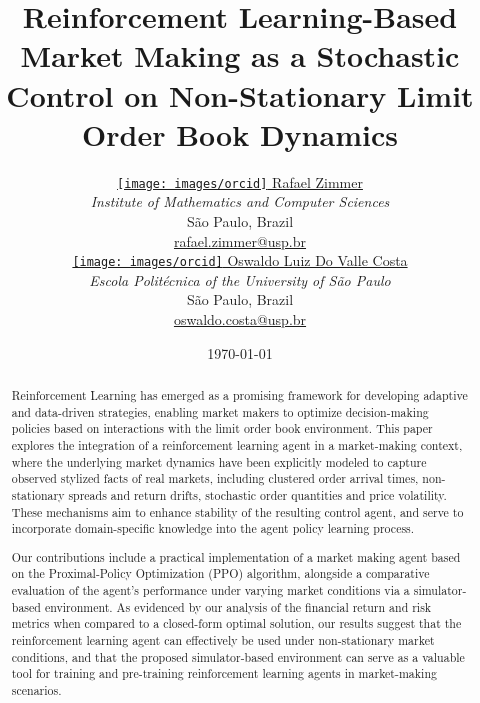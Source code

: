 \title{Reinforcement Learning-Based Market Making as a Stochastic Control on Non-Stationary Limit Order Book Dynamics}
\author{
    \begin{minipage}{0.45\textwidth}
        \centering
        \href{https://orcid.org/0009-0008-6064-9895}{\texttt{[image: images/orcid]} Rafael Zimmer}\\
        \textit{Institute of Mathematics and Computer Sciences} \\
        São Paulo, Brazil \\
        \href{mailto:rafael.zimmer@usp.br}{rafael.zimmer@usp.br}
    \end{minipage}
    \hfill
    \begin{minipage}{0.45\textwidth}
        \centering
        \href{https://orcid.org/0000-0001-5989-7287}{\texttt{[image: images/orcid]} Oswaldo Luiz Do Valle Costa}\\
        \textit{Escola Politécnica of the University of São Paulo} \\
        São Paulo, Brazil \\
        \href{mailto:oswaldo.costa@usp.br}{oswaldo.costa@usp.br}
    \end{minipage}
}

\date{\today}

\maketitle

\begin{abstract}
    Reinforcement Learning has emerged as a promising framework for developing adaptive and data-driven strategies,
    enabling market makers to optimize decision-making policies based on interactions with the limit order book environment.
    This paper explores the integration of a reinforcement learning agent in a market-making context,
    where the underlying market dynamics have been explicitly modeled to capture observed stylized facts of real markets,
    including clustered order arrival times, non-stationary spreads and return drifts, stochastic order quantities and price volatility.
    These mechanisms aim to enhance stability of the resulting control agent,
    and serve to incorporate domain-specific knowledge into the agent policy learning process.

    Our contributions include a practical implementation of a market making agent based on the Proximal-Policy Optimization (PPO) algorithm,
    alongside a comparative evaluation of the agent's performance under varying market conditions via a simulator-based environment.
    As evidenced by our analysis of the financial return and risk metrics when compared to a closed-form optimal solution,
    our results suggest that the reinforcement learning agent can effectively be used under non-stationary market conditions,
    and that the proposed simulator-based environment can serve as a valuable tool for training and
    pre-training reinforcement learning agents in market-making scenarios.
\end{abstract}
